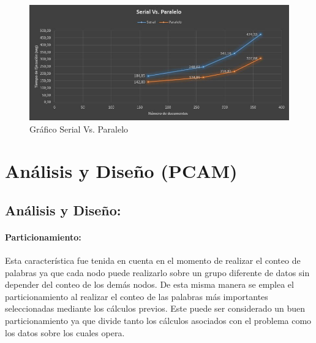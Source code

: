 \documentclass[fleqn,10pt]{SelfArx} %
\begin{document}


\begin{figure}[ht]\centering %
	\includegraphics[width=\linewidth]{graficoSerialParalelo}
	\caption{Gráfico Serial Vs. Paralelo}
	\label{fig:graficoSerialParalelo}
\end{figure}


\section{Análisis y Diseño (PCAM)}

\subsection{Análisis y Diseño:}

\paragraph{Particionamiento:}
Esta característica fue tenida en cuenta en el momento de realizar el conteo de palabras ya que cada nodo puede realizarlo sobre un grupo diferente de datos sin depender del conteo de los demás nodos. 
De esta misma manera se emplea el particionamiento al realizar el conteo de las palabras más importantes seleccionadas  mediante los cálculos previos.
Este puede ser considerado un buen particionamiento ya que divide tanto los cálculos asociados con el problema como los datos sobre los cuales opera.
\end{document}
